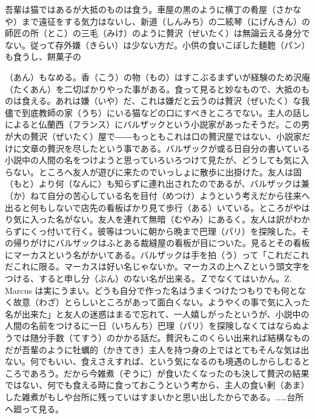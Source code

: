 \documentclass{book}
\begin{document}
吾輩は猫ではあるが大抵のものは食う。車屋の黒のように横丁の肴屋（さかなや）まで遠征をする気力はないし、新道（しんみち）の二絃琴（にげんきん）の師匠の所（とこ）の三毛（みけ）のように贅沢（ぜいたく）は無論云える身分でない。従って存外嫌（きらい）は少ない方だ。小供の食いこぼした麺麭（パン）も食うし、餅菓子の\begin{comment}\texttt{[image: ../../../gaiji/2-92/2-92-68.png]}\end{comment}（あん）もなめる。香（こう）の物（もの）はすこぶるまずいが経験のため沢庵（たくあん）を二切ばかりやった事がある。食って見ると妙なもので、大抵のものは食える。あれは嫌（いや）だ、これは嫌だと云うのは贅沢（ぜいたく）な我儘で到底教師の家（うち）にいる猫などの口にすべきところでない。主人の話しによると仏蘭西（フランス）にバルザックという小説家があったそうだ。この男が大の贅沢（ぜいたく）屋で――もっともこれは口の贅沢屋ではない、小説家だけに文章の贅沢を尽したという事である。バルザックが或る日自分の書いている小説中の人間の名をつけようと思っていろいろつけて見たが、どうしても気に入らない。ところへ友人が遊びに来たのでいっしょに散歩に出掛けた。友人は固（もと）より何（なんに）も知らずに連れ出されたのであるが、バルザックは兼（か）ねて自分の苦心している名を目付（めつけ）ようという考えだから往来へ出ると何もしないで店先の看板ばかり見て歩行（ある）いている。ところがやはり気に入った名がない。友人を連れて無暗（むやみ）にあるく。友人は訳がわからずにくっ付いて行く。彼等はついに朝から晩まで巴理（パリ）を探険した。その帰りがけにバルザックはふとある裁縫屋の看板が目についた。見るとその看板にマーカスという名がかいてある。バルザックは手を拍（う）って「これだこれだこれに限る。マーカスは好い名じゃないか。マーカスの上へＺという頭文字をつける、すると申し分（ぶん）のない名が出来る。Ｚでなくてはいかん。Z. Marcus は実にうまい。どうも自分で作った名はうまくつけたつもりでも何となく故意（わざ）とらしいところがあって面白くない。ようやくの事で気に入った名が出来た」と友人の迷惑はまるで忘れて、一人嬉しがったというが、小説中の人間の名前をつけるに一日（いちんち）巴理（パリ）を探険しなくてはならぬようでは随分手数（てすう）のかかる話だ。贅沢もこのくらい出来れば結構なものだが吾輩のように牡蠣的（かきてき）主人を持つ身の上ではとてもそんな気は出ない。何でもいい、食えさえすれば、という気になるのも境遇のしからしむるところであろう。だから今雑煮（ぞうに）が食いたくなったのも決して贅沢の結果ではない、何でも食える時に食っておこうという考から、主人の食い剰（あま）した雑煮がもしや台所に残っていはすまいかと思い出したからである。\ldots{}\ldots{}台所へ廻って見る。
\end{document}
